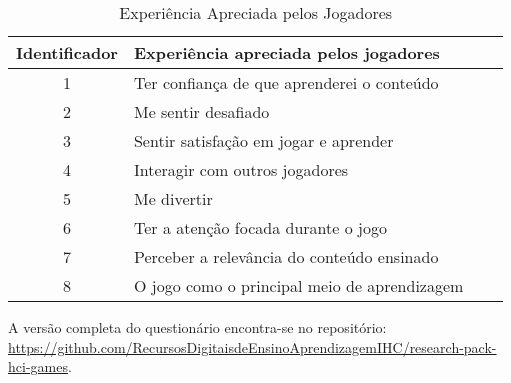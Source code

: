 \begin{apendicesenv}
\begin{table}[htbp]
\centering
\caption{ Experiência Apreciada pelos Jogadores}
\label{tab:exp-player}
\begin{tabular}{clcl}
\hline
\multicolumn{1}{|c|}{\textbf{Identificador}} & \multicolumn{1}{l|}{\textbf{Experiência apreciada pelos jogadores}}  \\ \hline
\multicolumn{1}{|c|}{1}                   & \multicolumn{1}{l|}{Ter confiança de que aprenderei o conteúdo}     \\ \hline
\multicolumn{1}{|c|}{2}                   & \multicolumn{1}{l|}{Me sentir desafiado}                  \\ \hline
\multicolumn{1}{|c|}{3}                   & \multicolumn{1}{l|}{Sentir satisfação em jogar e aprender}         \\ \hline
\multicolumn{1}{|c|}{4}                   & \multicolumn{1}{l|}{Interagir com outros jogadores}             \\ \hline
\multicolumn{1}{|c|}{5}                   & \multicolumn{1}{l|}{Me divertir}                                   \\ \hline
\multicolumn{1}{|c|}{6}                   & \multicolumn{1}{l|}{Ter a atenção focada durante o jogo}            \\ \hline
\multicolumn{1}{|c|}{7}                   & \multicolumn{1}{l|}{Perceber a relevância do conteúdo ensinado}      \\ \hline
\multicolumn{1}{|c|}{8}                   & \multicolumn{1}{l|}{O jogo como o principal meio de aprendizagem}        \\ \hline
                                                                                                    
\end{tabular}
\end{table}

A versão completa do questionário encontra-se no repositório: \url{https://github.com/RecursosDigitaisdeEnsinoAprendizagemIHC/research-pack-hci-games}.


   

\end{apendicesenv}
